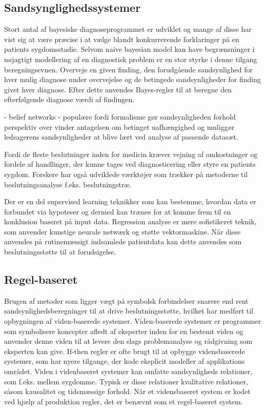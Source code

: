 \subsection{Sandsynglighedssystemer}
Stort antal af bayesiske diagnoseprogrammet er udviklet og mange af disse har vist sig at være præcise i at vælge blandt konkurrerende forklaringer på en patients sygdomsstadie. Selvom naive bayesian model kan have begrænsninger i nøjagtigt modellering af en diagnostisk problem er en stor styrke i denne tilgang beregningsevnen. Overveje en given finding, den forudgående sandsynlighed for hver mulig diagnose under overvejelse og de betingede sandsynligheder for finding givet hver diagnose. Efter dette anvendes Bayes-regler til at beregne den efterfølgende diagnose værdi af findingen. \citep{Masys2006a}

- belief networks - populære fordi formalisme gør sandsynligheden forhold perspektiv over vinder antagelsen om betinget uafhængighed og muliggør ledsagerens sandsynligheder at blive lært ved analyse af passende datasæt. 

Fordi de fleste beslutninger inden for medicin kræver vejning af omkostninger og fordele af handlinger, der kunne tages ved diagnosticering eller styre en patients sygdom. Forskere har også udviklede værktøjer som trækker på metoderne til beslutningsanalyse f.eks. beslutningstræ.  

Der er en del supervised learning teknikker som kan bestemme, hvordan data er forbundet via hypoteser og dermed kan trænes for at komme frem til en konklusion  baseret på input data. Regression analyse er mere sofistikeret teknik, som anvender kunstige neurale netwærk og støtte vektormaskine. Når disse anvendes på rutinemæssigt indsamlede patientdata kan dette anvendes som beslutningsstøtte til at forudsigelse.

\subsection{Regel-baseret}
Brugen af metoder som ligger vægt på symbolsk forbindelser snarere end rent sandsynlighedsberegninger til at drive beslutningsstøtte, hvilket har medført til opbygningen af viden-baserede systemer. Viden-baserede systemer er programmer som symbolisere koncepter afledt af eksperter inden for en bestemt viden og anvender denne viden til at levere den slags problemanalyse og rådgivning som eksperten kan give. If-then regler er ofte brugt til at opbygge vidensbaserede systemer, som har nyere tilgange, der kode eksplicit modeller af applikations området. Viden i videnbaseret systemer kan omfatte sandsynligheds relationer, som f.eks. mellem sygdomme. Typisk er disse relationer kvalitative relationer, såsom kausalitet og tidsmæssige forhold. Når et vidensbaseret system er kodet ved hjælp af produktion regler, det er benævnt som et regel-baseret system.\citep{Masys2006a}

